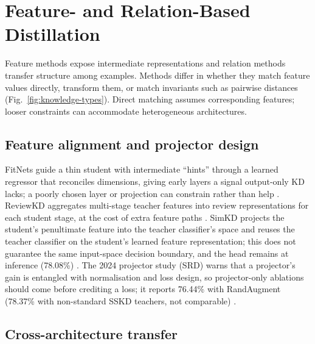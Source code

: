 \section{Feature- and Relation-Based Distillation}
\label{sec:feature}


Feature methods expose intermediate representations and relation methods transfer structure among examples. Methods differ in whether they match feature values directly, transform them, or match invariants such as pairwise distances (Fig.~\ref{fig:knowledge-types}). Direct matching assumes corresponding features; looser constraints can accommodate heterogeneous architectures.

\subsection{Feature alignment and projector design}

FitNets guide a thin student with intermediate ``hints'' through a learned regressor that reconciles dimensions, giving early layers a signal output-only KD lacks; a poorly chosen layer or projection can constrain rather than help \citep{romero2015fitnets}. ReviewKD aggregates multi-stage teacher features into review representations for each student stage, at the cost of extra feature paths \citep{chen2021reviewkd}. SimKD projects the student's penultimate feature into the teacher classifier's space and reuses the teacher classifier on the student's learned feature representation; this does not guarantee the same input-space decision boundary, and the head remains at inference (78.08\%) \citep{chen2022simkd}. The 2024 projector study (SRD) warns that a projector's gain is entangled with normalisation and loss design, so projector-only ablations should come before crediting a loss; it reports 76.44\% with RandAugment (78.37\% with non-standard SSKD teachers, not comparable) \citep{miles2024projector}.

\subsection{Cross-architecture transfer}

